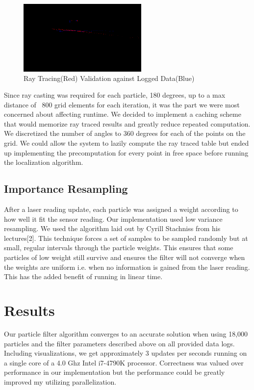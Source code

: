\documentclass{article}
\begin{document}
\begin{figure}[!h]
    \centering
    \includegraphics[width=2.5in]{media/ray_tracing.png}
    \caption{Ray Tracing(Red) Validation against Logged Data(Blue)}
\label{fig:5}
\end{figure}

Since ray casting was required for each particle, 180 degrees, up to a max distance of ~800 grid elements for each iteration, it was the part we were most concerned about affecting runtime.  We decided to implement a caching scheme that would memorize ray traced results and greatly reduce repeated computation. We discretized the number of angles to 360 degrees for each of the points on the grid. We could allow the system to lazily compute the ray traced table but ended up implementing the precomputation for every point in free space before running the localization algorithm.   

\subsection{Importance Resampling}

After a laser reading update, each particle was assigned a weight according to how well it fit the sensor reading. Our implementation used low variance resampling. We used the algorithm laid out by Cyrill Stachniss from his lectures[2].  This technique forces a set of samples to be sampled randomly but at small, regular intervals through the particle weights. This ensures that some particles of low weight still survive and ensures the filter will not converge when the weights are uniform i.e. when no information is gained from the laser reading.  This has the added benefit of running in linear time.

\section{Results}

Our particle filter algorithm converges to an accurate solution when using 18,000 particles and the filter parameters described above on all provided data logs.  Including visualizations, we get approximately 3 updates per seconds running on a single core of a 4.0 Ghz Intel i7-4790K processor. Correctness was valued over performance in our implementation but the performance could be greatly improved my utilizing parallelization.
\end{document}
